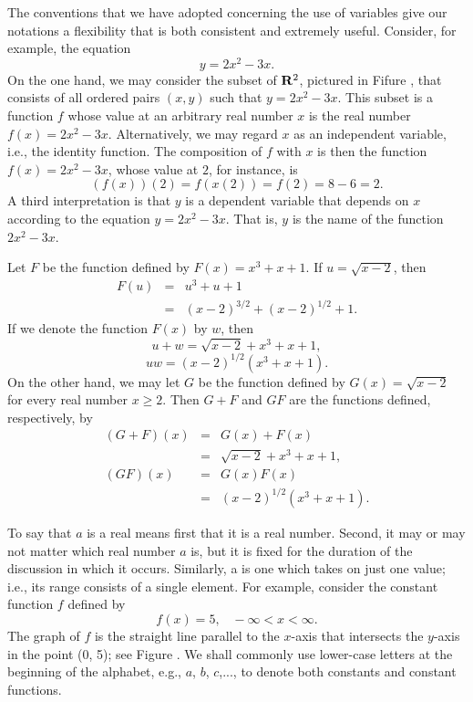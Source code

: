 \begin{example}\label{exam 1.3.2}
The conventions that we have adopted
concerning the use of variables
give our notations a flexibility
that is both consistent and extremely useful.
Consider, for example, the equation
\[
y= 2x^2 - 3x.
\]
On the one hand,
we may consider the subset of $\mathrm{\bf R}^2$, pictured in
Fifure ,
that consists of all ordered pairs $(x, y)$ such that $y = 2x^2 - 3x$.
This subset is a function $f$
whose value at an arbitrary real number $x$
is the real number $f(x) = 2x^2 - 3x$.
Alternatively,
we may regard $x$ as an independent variable,
i.e., the identity function.
The composition of $f$ with $x$ is then the
function $f(x) = 2x^2 - 3x$, whose value at $2$,
for instance, is
\[
(f(x))(2) = f(x(2)) = f(2) = 8 - 6 = 2.
\]
A third interpretation
is that $y$ is a dependent variable that depends on $x$
according to the equation $y = 2x^2 - 3x$.
That is, $y$ is the name of the function $2x^2 - 3x$.
\end{example}

\begin{example}\label{exam 1.3.3}
Let $F$ be the function defined by
$F(x) = x^3 + x + 1$. If $u = \sqrt{x - 2}$,
then
\begin{eqnarray*}
F(u)
&=&  u^3 + u + 1  \\
&=&  (x - 2)^{3/2} + (x - 2)^{1/2} + 1.
\end{eqnarray*}
If we denote the function $F(x)$ by $w$, then 
\[
u + w =  \sqrt{x - 2} + x^3 + x + 1,
\]
\[
uw = (x - 2)^{1/2} (x^3 + x + 1).
\]
On the other hand,
we may let $G$ be the function defined by
$G(x) = \sqrt{x - 2}$
for every real number $x \geq 2$.
Then $G + F$ and $GF$ are the functions defined, respectively, by
\begin{eqnarray*}
(G + F)(x)
&=&  G(x) + F(x) \\
&=&  \sqrt{x - 2} + x^3 + x + 1, \\
(GF)(x)
&=& G(x)F(x) \\
&=&  (x - 2)^{1/2} (x^3 + x + 1).
\end{eqnarray*}
\end{example}

To say that $a$ is a real 
means first that it is a real number.
Second, it may or may not matter which real number $a$ is,
but it is fixed for the duration of the discussion in which it occurs.
Similarly, a  is one which takes on just one value;
i.e., its range consists of a single element.
For example, consider the constant function $f$ defined by
\[
f(x) = 5, \;\;\; - \infty < x < \infty.
\]
The graph of $f$ is the straight line parallel to the $x$-axis
that intersects the $y$-axis in the point (0, 5);
see Figure .
We shall commonly use lower-case letters
at the beginning of the alphabet,
e.g., $a$, $b$, $c$,...,
to denote both constants and constant functions.


